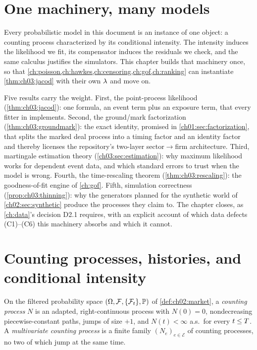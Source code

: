 
\section{One machinery, many models}\label{ch03:sec:overview}

Every probabilistic model in this document is an instance of one object: a
counting process characterized by its conditional intensity. The intensity
induces the likelihood we fit, its compensator induces the residuals we
check, and the same calculus justifies the simulators. This chapter builds
that machinery once, so that
\cref{ch:poisson,ch:hawkes,ch:censoring,ch:gof,ch:ranking} can instantiate
\cref{thm:ch03:jacod} with their own $\lambda$ and move on.

Five results carry the weight. First, the point-process likelihood
(\cref{thm:ch03:jacod}): one formula, an event term plus an exposure term,
that every fitter in \modrepo{} implements. Second, the ground/mark
factorization (\cref{thm:ch03:groundmark}): the exact identity, promised in
\cref{ch01:sec:factorization}, that splits the marked deal process into a
timing factor and an identity factor and thereby licenses the repository's
two-layer sector$\to$firm architecture. Third, martingale estimation theory
(\cref{ch03:sec:estimation}): why maximum likelihood works for dependent
event data, and which standard errors to trust when the model is wrong.
Fourth, the time-rescaling theorem (\cref{thm:ch03:rescaling}): the
goodness-of-fit engine of \cref{ch:gof}. Fifth, simulation correctness
(\cref{prop:ch03:thinning}): why the generators planned for the synthetic
world of \cref{ch02:sec:synthetic} produce the processes they claim to.
The chapter closes, as \cref{ch:data}'s decision D2.1 requires, with an
explicit account of which data defects (C1)--(C6) this machinery absorbs
and which it cannot.

\section{Counting processes, histories, and conditional intensity}\label{ch03:sec:counting}

\begin{definition}\label{def:ch03:counting}
On the filtered probability space $(\Omega,\mathcal{F},\{\mathcal{F}_{t}\},\mathbb{P})$ of
\cref{def:ch02:market}, a \emph{counting process} $N$ is an adapted,
right-continuous process with $N(0)=0$, nondecreasing piecewise-constant
paths, jumps of size $+1$, and $N(t)<\infty$ a.s.\ for every $t \le T$.
A \emph{multivariate counting process} is a finite family
$(N_e)_{e \in \mathcal{E}}$ of counting processes, no two of which jump at
the same time.
\end{definition}

